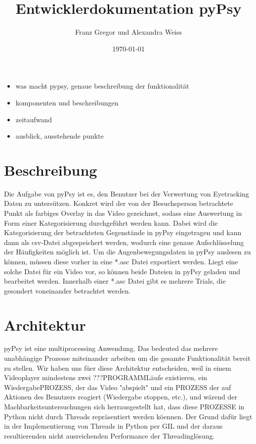 \documentclass[a4paper,draft]{scrartcl}
\title{Entwicklerdokumentation pyPsy}
\author{Franz Gregor und Alexandra Weiss}
\date{\today}
\begin{document}
\maketitle
\newpage
\tableofcontents
\begin{itemize}
	\item was macht pypsy, genaue beschreibung der funktionalität
	\item komponenten und beschreibungen 
	\item zeitaufwand
	\item ausblick, ausstehende punkte
\end{itemize}
\newpage
\section{Beschreibung}
Die Aufgabe von pyPsy ist es, den Benutzer bei der Verwertung von Eyetracking Daten zu untersützen. Konkret wird der von der Besuchsperson betrachtete Punkt als farbiges Overlay in das Video gezeichnet, sodass eine Auswertung in Form einer Kategorisierung durchgeführt werden kann. Dabei wird die Kategorisierung der betrachteten Gegenstände in pyPsy eingetragen und kann dann als csv-Datei abgespeichert werden, wodurch eine genaue Aufschlüsselung der Häufigkeiten möglich ist. 
Um die Augenbewegungsdaten in pyPsy auslesen zu können, müssen diese vorher in eine *.asc Datei exportiert werden. Liegt eine solche Datei für ein Video vor, so können beide Dateien in pyPsy geladen und bearbeitet werden.
Innerhalb einer *.asc Datei gibt es mehrere Trials, die gesondert voneinander betrachtet werden.

\section{Architektur}
pyPsy ist eine multiprocessing Anwendung.
Das bedeuted das mehrere unabh\"angige Prozesse miteinander arbeiten um die gesamte Funktionalit\"at bereit zu stellen.
Wir haben uns f\"uer diese Architektur entscheiden, weil in einem Videoplayer mindestens zwei ???PROGRAMML\"aufe existieren, ein WiedergabePROZESS, der das Video "abspielt" und ein PROZESS der auf Aktionen des Benutzers reagiert (Wiedergabe stoppen, etc.), und w\"arend der Machbarkeitsuntersuchungen sich herrausgestellt hat, dass diese PROZESSE in Python nicht durch Threads repr\"asentiert werden k\"oennen.
Der Grund daf\"ur liegt in der Implementierung von Threads in Python per GIL und der daraus resultierenden nicht ausreichenden Performance der Threadingl\"osung.
\end{document}
